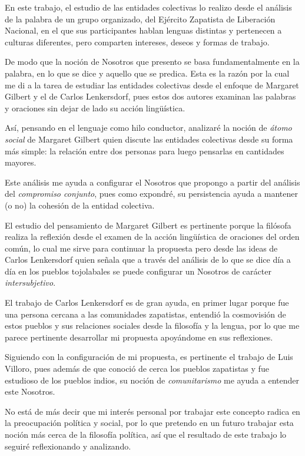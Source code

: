 \documentclass[oneside]{book}
\begin{document}
En este trabajo, el estudio de las entidades colectivas lo realizo desde el análisis de la palabra de un grupo organizado, del Ejército Zapatista de Liberación Nacional, en el que sus participantes hablan lenguas distintas y pertenecen a culturas diferentes, pero comparten intereses, deseos y formas de trabajo.

De modo que la noción de Nosotros que presento se basa fundamentalmente en la palabra, en lo que se dice y aquello que se predica. Esta es la razón por la cual me di a la tarea de estudiar las entidades colectivas desde el enfoque de Margaret Gilbert y el de Carlos Lenkersdorf, pues estos dos autores examinan las palabras y oraciones sin dejar de lado su acción lingüística. 

Así, pensando en el lenguaje como hilo conductor, analizaré la noción de \textit{átomo social} de Margaret Gilbert quien discute las entidades colectivas desde su forma más simple: la relación entre dos personas para luego pensarlas en cantidades mayores. 

Este análisis me ayuda a configurar el Nosotros que propongo a partir del análisis del \textit{compromiso conjunto}, pues como expondré, su persistencia ayuda a mantener (o no) la cohesión de la entidad colectiva.

El estudio del pensamiento de Margaret Gilbert es pertinente porque la filósofa realiza la reflexión desde el examen de la acción lingüística de oraciones del orden común, lo cual me sirve para continuar la propuesta pero desde las ideas de Carlos Lenkersdorf quien señala que a través del análisis de lo que se dice día a día en los pueblos tojolabales se puede configurar un Nosotros de carácter  \textit{intersubjetivo}.

El trabajo de Carlos Lenkersdorf es de gran ayuda, en primer lugar porque fue una persona cercana a las comunidades zapatistas, entendió la cosmovisión de estos pueblos y sus relaciones sociales desde la filosofía y la lengua, por lo que me parece pertinente desarrollar mi propuesta apoyándome en sus reflexiones. 

Siguiendo con la configuración de mi propuesta, es pertinente el trabajo de Luis Villoro, pues además de que conoció de cerca los pueblos zapatistas y fue estudioso de los pueblos indios, su noción de \textit{comunitarismo} me ayuda a entender este Nosotros.


No está de más decir que mi interés personal por trabajar este concepto radica en la preocupación política y social, por lo que pretendo en un futuro trabajar esta noción más cerca de la filosofía política, así que el resultado de este trabajo lo seguiré reflexionando y analizando.
\end{document}
